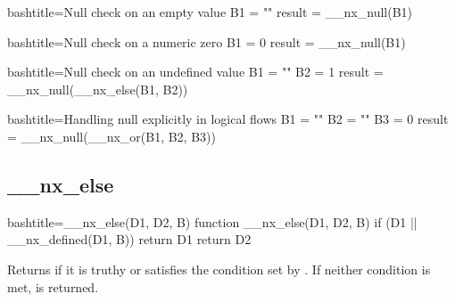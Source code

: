 \begin{NexCodeBox}{bash}{title={Null check on an empty value}}
	B1 = ""
	result = __nx_null(B1)
\end{NexCodeBox}

\begin{NexCodeBox}{bash}{title={Null check on a numeric zero}}
	B1 = 0
	result = __nx_null(B1)
\end{NexCodeBox}

\begin{NexCodeBox}{bash}{title={Null check on an undefined value}}
	B1 = ""
	B2 = 1
	result = __nx_null(__nx_else(B1, B2))
\end{NexCodeBox}


\begin{NexCodeBox}{bash}{title={Handling null explicitly in logical flows}}
	B1 = ""
	B2 = ""
	B3 = 0
	result = __nx_null(__nx_or(B1, B2, B3))
\end{NexCodeBox}

\newpage
\subsection{__nx_else}
\label{__nx_else}
\begin{NexCodeBox}{bash}{title={__nx_else(D1, D2, B)}}
function __nx_else(D1, D2, B) {
	if (D1 || __nx_defined(D1, B))
		return D1
	return D2
}
\end{NexCodeBox}

\begin{NexMainBox}
	\begin{NexMainBox}
		Returns  if it is truthy or satisfies the condition set by . If neither condition is met,  is returned.
	\end{NexMainBox}
	\begin{NexMainBox}
		\begin{NexListDark}
		\end{NexListDark}
	\end{NexMainBox}
\end{NexMainBox}


